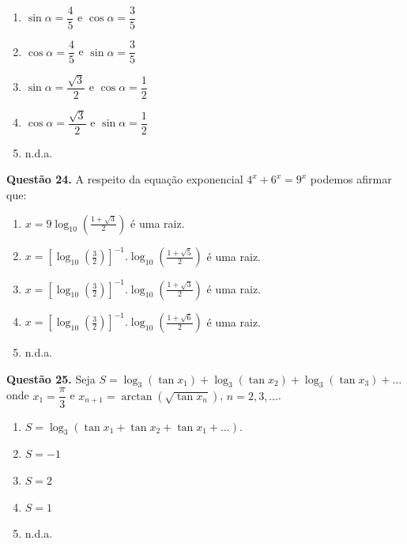 \documentclass[11pt]{article}
\begin{document}
\begin{multicols}{3}
    \begin{enumerate}[\bf A (\quad)]
        \item $\sin \alpha = \dfrac{4}{5}$ e $\cos \alpha = \dfrac{3}{5}$
        \item $\cos \alpha = \dfrac{4}{5}$ e $\sin \alpha = \dfrac{3}{5}$
        \item $\sin \alpha = \dfrac{\sqrt{3}}{2}$ e $\cos \alpha = \dfrac{1}{2}$
        \item $\cos \alpha = \dfrac{\sqrt{3}}{2}$ e $\sin \alpha = \dfrac{1}{2}$
        \item n.d.a.
    \end{enumerate}
\end{multicols}

\textbf{Questão 24.} A respeito da equação exponencial $4^x + 6^x = 9^x$ podemos afirmar que:

\begin{enumerate}[\bf A (\quad)]
    \item $\displaystyle x = 9 \log_{10} \left(\frac{1 + \sqrt{3}}{2}\right)$ é uma raiz.
    \item $\displaystyle x = \left[\log_{10}\left(\frac{3}{2}\right)\right]^{-1}.\log_{10}\left(\frac{1 + \sqrt{5}}{2}\right)$ é uma raiz. 
    \item $\displaystyle x = \left[\log_{10}\left(\frac{3}{2}\right)\right]^{-1}.\log_{10}\left(\frac{1 + \sqrt{3}}{2}\right)$ é uma raiz. 
    \item $\displaystyle x = \left[\log_{10}\left(\frac{3}{2}\right)\right]^{-1}.\log_{10}\left(\frac{1 + \sqrt{6}}{2}\right)$ é uma raiz. 
    \item n.d.a.
\end{enumerate}

\newpage

\textbf{Questão 25.} Seja $S = \log_3(\tan x_1) + \log_3(\tan x_2) + \log_3(\tan x_3) + \dots$ onde $x_1 = \dfrac{\pi}{3}$ e $x_{n+1} = \arctan(\sqrt{\tan x_n})$, $n = 2, 3, \dots$.


    \begin{enumerate}[\bf A (\quad)]
        \item $S = \log_3 (\tan x_1 + \tan x_2 + \tan x_1 + \dots)$.
        \item $S = -1$
        \item $S = 2$
        \item $S = 1$
        \item n.d.a.
    \end{enumerate}
\end{document}
